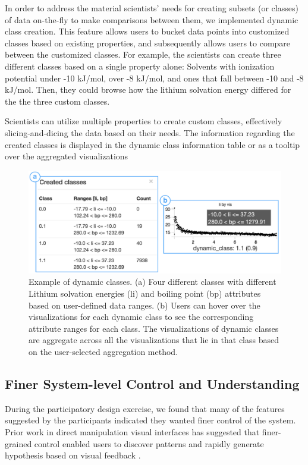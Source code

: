  In order to address the material scientists' needs for creating subsets (or classes) of data on-the-fly to make comparisons between them, we implemented dynamic class creation. This feature allows users to bucket data points into customized classes based on existing properties, and subsequently allows users to compare between the customized classes. For example, the scientists can create three different classes based on a single property alone: Solvents with ionization potential under -10 kJ/mol, over -8 kJ/mol, and ones that fall between -10 and -8 kJ/mol. Then, they could browse how the lithium solvation energy differed for the the three custom classes. 
\par Scientists can utilize multiple properties to create custom classes, effectively slicing-and-dicing the data based on their needs. The information regarding the created classes is displayed in the dynamic class information table or as a tooltip over the aggregated visualizations
\begin{figure}[ht!]
\centering
\includegraphics[width=\linewidth]{figures/dcc_example.pdf}
\vspace{-6pt}
\caption{Example of dynamic classes. (a) Four different classes with different Lithium solvation energies (li) and boiling point (bp) attributes based on user-defined data ranges. (b) Users can hover over the visualizations for each dynamic class to see the corresponding attribute ranges for each class. The visualizations of dynamic classes are aggregate across all the visualizations that lie in that class based on the user-selected aggregation method.}
\label{dcc}
\end{figure}
\subsection{Finer System-level Control and  Understanding}
\par During the participatory design exercise, we found that many of the features suggested by the participants indicated they wanted finer control of the system. Prior work in direct manipulation visual interfaces has suggested that finer-grained control enabled users to discover patterns and rapidly generate hypothesis based on visual feedback \cite{Shneiderman1994,Shneiderman2007a}. 

